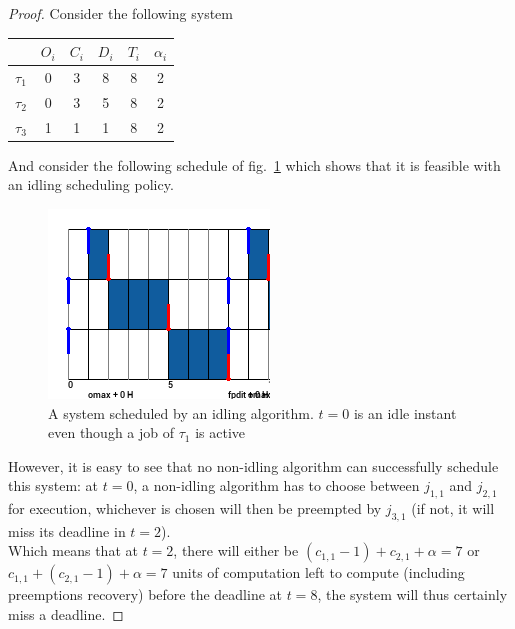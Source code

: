 \documentclass[a4paper,10pt]{article}
\begin{document}
        \begin{proof}
        Consider the following system

        \begin{center}
            \begin{tabular}{|r|c|c|c|c|c|}
                \hline
                            & $O_i$ & $C_i$ & $D_i$ & $T_i$ & $\alpha_i$ \\ \hline
                $\tau_1$    & 0     & 3     & 8    & 8     & 2     \\ \hline
                $\tau_2$    & 0     & 3     & 5    & 8     & 2     \\ \hline
                $\tau_3$    & 1     & 1     & 1    & 8     & 2     \\ \hline
            \end{tabular}
        \end{center}

        And consider the following schedule of fig.~\ref{fig:mustidle_pallf} which shows that it is feasible with an idling scheduling policy.

        \begin{figure}[H]
        \begin{center}
            \includegraphics[scale=0.7]{figs/mustIdle_PALLF.png}
            \caption{A system scheduled by an idling algorithm. $t=0$ is an idle instant even though a job of $\tau_1$ is active}
            \label{fig:mustidle_pallf}
        \end{center}
        \end{figure}

        However, it is easy to see that no non-idling algorithm can successfully schedule this system: at $t=0$, a non-idling algorithm has to choose between $j_{1,1}$ and $j_{2,1}$ for execution, whichever is chosen will then be preempted by $j_{3,1}$ (if not, it will miss its deadline in $t=2$).\\

        Which means that at $t=2$, there will either be \mbox{$(c_{1,1} - 1) +c_{2,1} + \alpha = 7$} or \mbox{$c_{1,1} + (c_{2,1} -1) + \alpha = 7$} units of computation left to compute (including preemptions recovery) before the deadline at $t=8$, the system will thus certainly miss a deadline.

        \end{proof}
\end{document}
